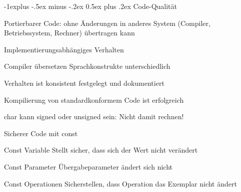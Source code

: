\documentclass[a4paper]{article}
\makeatletter
\renewcommand{\subsection}{\@startsection{subsection}{2}{0mm}%
                                {-1explus -.5ex minus -.2ex}%
                                {0.5ex plus .2ex}%
                                {\normalfont\normalsize\bfseries}}
\makeatother
\begin{document}
\begin{multicols}{3}
  \subsection{Code-Qualität}
  \begin{itemize*}
    \item Portierbarer Code: ohne Änderungen in anderes System (Compiler, Betriebssystem, Rechner) übertragen kann
    \item Implementierungsabhängiges Verhalten
    \begin{itemize*}
      \item Compiler übersetzen Sprachkonstrukte unterschiedlich
      \item Verhalten ist konsistent festgelegt und dokumentiert
      \item Kompilierung von standardkonformem Code ist erfolgreich
      \item char kann signed oder unsigned sein: Nicht damit rechnen!
    \end{itemize*}
    \item Sicherer Code mit const
    \begin{description*}
      \item[Const Variable] Stellt sicher, dass sich der Wert nicht verändert
      \item[Const Parameter] Übergabeparameter ändert sich nicht
      \item[Const Operationen] Sicherstellen, dass Operation das Exemplar nicht ändert
    \end{description*}
  \end{itemize*}


\end{multicols}
\end{document}
